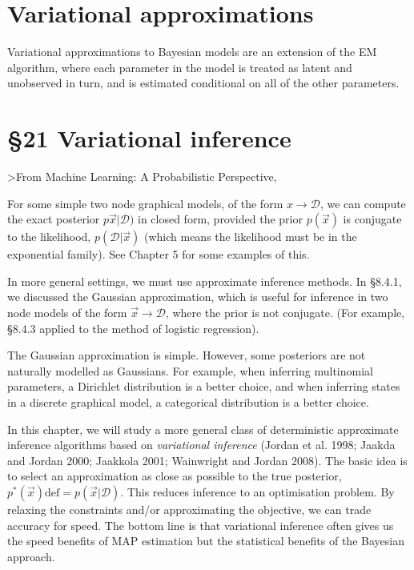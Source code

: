\documentclass{amsart}
\begin{document}
\section{Variational approximations}
Variational approximations to Bayesian models are an extension of the EM algorithm,
where each parameter in the model is treated as latent and unobserved in turn, and is
estimated conditional on all of the other parameters.

\section{\S 21 Variational inference}

>From Machine Learning: A Probabilistic Perspective,

For some simple two node graphical models, of the form $x \to \mathcal{D}$, we can compute
the exact posterior $p\vec{x}|\mathcal{D})$ in closed form, provided the prior $p(\vec{x})$ 
is conjugate to the likelihood, $p(\mathcal{D}|\vec{x})$ (which means the likelihood must
be in the exponential family). See Chapter 5 for some examples of this.

In more general settings, we must use approximate inference methods. In \S 8.4.1, we
discussed the Gaussian approximation, which is useful for inference in two node models of
the form $\vec{x} \to \mathcal{D}$, where the prior is not conjugate. (For example, 
\S 8.4.3 applied to the method of logistic regression).

The Gaussian approximation is simple. However, some posteriors are not naturally modelled as
Gaussians. For example, when inferring multinomial parameters, a Dirichlet
distribution is a better choice, and when inferring states in a discrete graphical model,
a categorical distribution is a better choice.

In this chapter, we will study a more general class of deterministic approximate inference
algorithms based on \emph{variational inference} (Jordan et al. 1998; Jaakda and Jordan 
2000; Jaakkola 2001; Wainwright and Jordan 2008). The basic idea is to select an approximation
as close as possible to the true posterior,
$p^{*}(\vec{x}) \text{def} = p(\vec{x}|\mathcal{D})$. This reduces inference to an 
optimisation problem. By relaxing the constraints and/or approximating the objective, we can
trade accuracy for speed. The bottom line is that variational inference often gives us the
speed benefits of MAP estimation but the statistical benefits of the Bayesian approach.
\end{document}
